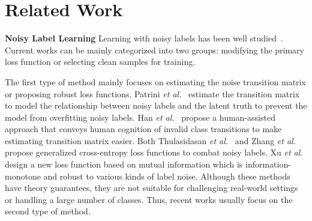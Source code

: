 \documentclass[runningheads]{llncs}
\begin{document}
\section{Related Work}
\label{sec:related}


\textbf{Noisy Label Learning} Learning with noisy labels has been well studied~\cite{patrini2017making, han2018masking, zhang2018generalized, thulasidasan2019combating, xu2019l_dmi, jiang2018mentornet, ren2018learning, arazo2019unsupervised, han2018co, malach2017decoupling, wei2020combating, xie2021partial, yi2019probabilistic, kim2019nlnl, huang2019o2u, han2019deep, li2020dividemix, ye2020purifynet, nguyen2019self, li2021learning}. Current works can be mainly categorized into two groups: modifying the primary loss function or selecting clean samples for training. 

The first type of method mainly focuses on estimating the noise transition matrix or proposing robust loss functions. Patrini \emph{et al.}~\cite{patrini2017making} estimate the transition matrix to model the relationship between noisy labels and the latent truth to prevent the model from overfitting noisy labels. Han \emph{et al.}~\cite{han2018masking} propose a human-assisted approach that conveys human cognition of invalid class transitions to make estimating transition matrix easier. Both Thulasidasan \emph{et al.}~\cite{thulasidasan2019combating} and Zhang \emph{et al.} ~\cite{zhang2018generalized} propose generalized cross-entropy loss functions to combat noisy labels. Xu \emph{et al.}~\cite{xu2019l_dmi} design a new loss function based on mutual information which is information-monotone and robust to various kinds of label noise. Although these methods have theory guarantees, they are not suitable for challenging real-world settings or handling a large number of classes. Thus, recent works usually focus on the second type of method.
\end{document}
